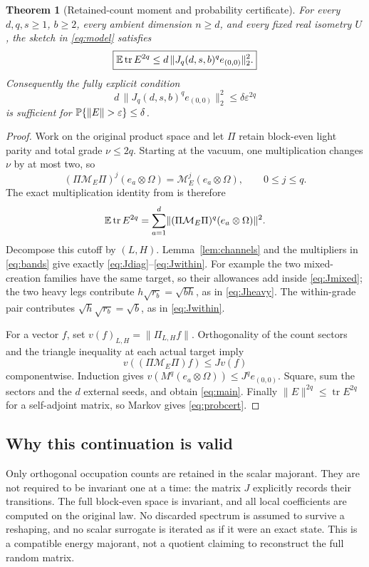\documentclass[11pt]{article}
\numberwithin{equation}{section}
\newtheorem{theorem}{Theorem}[section]
\theoremstyle{definition}\newtheorem{definition}[theorem]{Definition}
\theoremstyle{remark}\newtheorem{remark}[theorem]{Remark}
\newcommand{\tr}{\operatorname{tr}}\newcommand{\Ent}{\operatorname{Ent}}
\newcommand{\norm}[1]{\lVert#1\rVert}\newcommand{\ip}[2]{\langle#1,#2\rangle}
\begin{document}
\begin{theorem}[Retained-count moment and probability certificate]
For every $d,q,s\ge1$, $b\ge2$, every ambient dimension $n\ge d$, and every fixed real isometry $U$, the sketch in \eqref{eq:model} satisfies
\begin{equation}
 \boxed{\E\tr E^{2q}\le d\,\norm{J_q(d,s,b)^q e_{(0,0)}}_2^2.}
 \label{eq:main}
\end{equation}
Consequently the fully explicit condition
\begin{equation}
 \boxed{d\,\norm{J_q(d,s,b)^q e_{(0,0)}}_2^2
           \le\delta\varepsilon^{2q}}
 \label{eq:probcert}
\end{equation}
is sufficient for $\Prob\{\norm E>\varepsilon\}\le\delta$.
\end{theorem}
\begin{proof}
Work on the original product space and let $\Pi$ retain block-even light parity and total grade $\nu\le2q$. Starting at the vacuum, one multiplication changes $\nu$ by at most two, so
\[
 (\Pi\mathcal M_E\Pi)^j(e_a\otimes\Omega)
       =\mathcal M_E^j(e_a\otimes\Omega),\qquad 0\le j\le q.
\]
The exact multiplication identity from \cite{Framework} is therefore
\[
 \E\tr E^{2q}=\sum_{a=1}^d
       \norm{(\Pi\mathcal M_E\Pi)^q(e_a\otimes\Omega)}^2.
\]
Decompose this cutoff by $(L,H)$. Lemma~\ref{lem:channels} and the multipliers in \eqref{eq:bands} give exactly \eqref{eq:Jdiag}--\eqref{eq:Jwithin}. For example the two mixed-creation families have the same target, so their allowances add inside \eqref{eq:Jmixed}; the two heavy legs contribute $h\sqrt{r_b}=\sqrt{bh}$, as in \eqref{eq:Jheavy}. The within-grade pair contributes $\sqrt h\sqrt{r_b}=\sqrt b$, as in \eqref{eq:Jwithin}.

For a vector $f$, set $v(f)_{L,H}=\norm{\Pi_{L,H}f}$. Orthogonality of the count sectors and the triangle inequality at each actual target imply
\[
 v((\Pi\mathcal M_E\Pi)f)\le Jv(f)
\]
componentwise. Induction gives $v(M^q(e_a\otimes\Omega))\le J^qe_{(0,0)}$. Square, sum the sectors and the $d$ external seeds, and obtain \eqref{eq:main}. Finally $\norm E^{2q}\le\tr E^{2q}$ for a self-adjoint matrix, so Markov gives \eqref{eq:probcert}.
\end{proof}

\subsection{Why this continuation is valid}
Only orthogonal occupation counts are retained in the scalar majorant. They are not required to be invariant one at a time: the matrix $J$ explicitly records their transitions. The full block-even space is invariant, and all local coefficients are computed on the original law. No discarded spectrum is assumed to survive a reshaping, and no scalar surrogate is iterated as if it were an exact state. This is a compatible energy majorant, not a quotient claiming to reconstruct the full random matrix.
\end{document}
